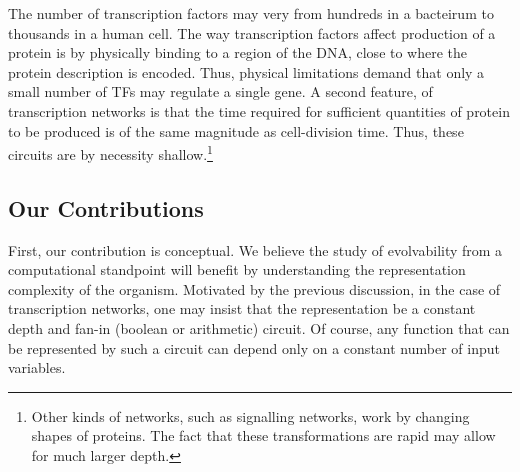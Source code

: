 The number of transcription factors may very from hundreds in a bacteirum to
thousands in a human cell. The way transcription factors affect production of a
protein is by physically binding to a region of the DNA, close to where the
protein description is encoded. Thus, physical limitations demand that only a
small number of TFs may regulate a single gene. A second feature, of
transcription networks is that the time required for sufficient quantities of
protein to be produced is of the same magnitude as cell-division time. Thus,
these circuits are by necessity shallow.\footnote{Other kinds of networks, such
as signalling networks, work by changing shapes of proteins. The fact that these
transformations are rapid may allow for much larger depth.}




\subsection{Our Contributions}

First, our contribution is conceptual. We believe the study of evolvability from
a computational standpoint will benefit by understanding the representation
complexity of the organism. Motivated by the previous discussion, in the case of
transcription networks, one may insist that the representation be a
constant depth and fan-in (boolean or arithmetic) circuit. Of course, any
function that can be represented by such a circuit can depend only on a constant
number of input variables.

